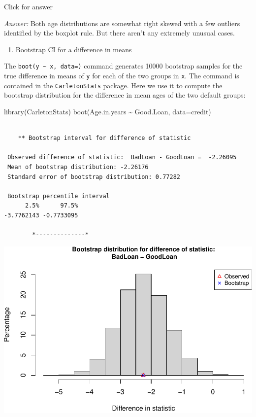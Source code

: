 \documentclass[
]{book}
\newenvironment{Shaded}{\begin{snugshade}}{\end{snugshade}}
\newcommand{\AttributeTok}[1]{\textcolor[rgb]{0.77,0.63,0.00}{#1}}
\newcommand{\FunctionTok}[1]{\textcolor[rgb]{0.00,0.00,0.00}{#1}}
\newcommand{\NormalTok}[1]{#1}
\newcommand{\SpecialCharTok}[1]{\textcolor[rgb]{0.00,0.00,0.00}{#1}}
\providecommand{\tightlist}{%
  \setlength{\itemsep}{0pt}\setlength{\parskip}{0pt}}
\begin{document}
Click for answer

\emph{Answer:} Both age distributions are somewhat right skewed with a few outliers identified by the boxplot rule. But there aren't any extremely unusual cases.

\begin{enumerate}
\def\labelenumi{(\alph{enumi})}
\setcounter{enumi}{1}
\tightlist
\item
  Bootstrap CI for a difference in means
\end{enumerate}

The \texttt{boot(y\ \textasciitilde{}\ x,\ data=)} command generates 10000 bootstrap samples for the true difference in means of \texttt{y} for each of the two groups in \texttt{x}. The command is contained in the \texttt{CarletonStats} package. Here we use it to compute the bootstrap distribution for the difference in mean ages of the two default groups:

\begin{Shaded}
\begin{Highlighting}[]
\FunctionTok{library}\NormalTok{(CarletonStats)}
\FunctionTok{boot}\NormalTok{(Age.in.years }\SpecialCharTok{\textasciitilde{}}\NormalTok{ Good.Loan, }\AttributeTok{data=}\NormalTok{credit)}
\end{Highlighting}
\end{Shaded}

\begin{verbatim}

    ** Bootstrap interval for difference of statistic

 Observed difference of statistic:  BadLoan - GoodLoan =  -2.26095 
 Mean of bootstrap distribution: -2.26176 
 Standard error of bootstrap distribution: 0.77282 

 Bootstrap percentile interval
      2.5%      97.5% 
-3.7762143 -0.7733095 

        *--------------*
\end{verbatim}

\includegraphics[width=1\linewidth]{Class_Activity_8_files/figure-latex/unnamed-chunk-10-1}
\end{document}
